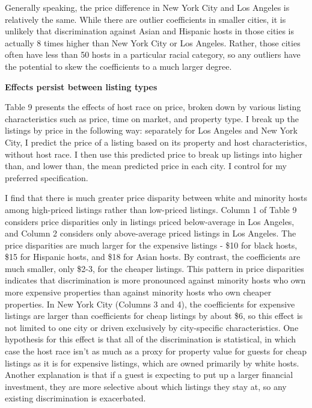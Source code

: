 Generally speaking, the price difference in New York City and Los Angeles is relatively the same. While there are outlier coefficients in smaller cities, it is unlikely that discrimination against Asian and Hispanic hosts in those cities is actually 8 times higher than New York City or Los Angeles. Rather, those cities often have less than 50 hosts in a particular racial category, so any outliers have the potential to skew the coefficients to a much larger degree.  

\textbf{Effects persist between listing types}

Table 9 presents the effects of host race on price, broken down by various listing characteristics such as price, time on market, and property type. I break up the listings by price in the following way: separately for Los Angeles and New York City, I predict the price of a listing based on its property and host characteristics, without host race. I then use this predicted price to break up listings into higher than, and lower than, the mean predicted price in each city. I control for my preferred specification.  

I find that there is much greater price disparity between white and minority hosts among high-priced listings rather than low-priced listings. Column 1 of Table 9 considers price disparities only in listings priced below-average in Los Angeles, and Column 2 considers only above-average priced listings in Los Angeles. The price disparities are much larger for the expensive listings - \$10 for black hosts, \$15 for Hispanic hosts, and \$18 for Asian hosts. By contrast, the coefficients are much smaller, only \$2-3, for the cheaper listings. This pattern in price disparities indicates that discrimination is more pronounced against minority hosts who own more expensive properties than against minority hosts who own cheaper properties. In New York City (Columns 3 and 4), the coefficients for expensive listings are larger than coefficients for cheap listings by about \$6, so this effect is not limited to one city or driven exclusively by city-specific characteristics. One hypothesis for this effect is that all of the discrimination is statistical, in which case the host race isn't as much as a proxy for property value for guests for cheap listings  as it is for expensive listings, which are owned primarily by white hosts. Another explanation is that if a guest is expecting to put up a larger financial investment, they are more selective about which listings they stay at, so any existing discrimination is exacerbated. 

